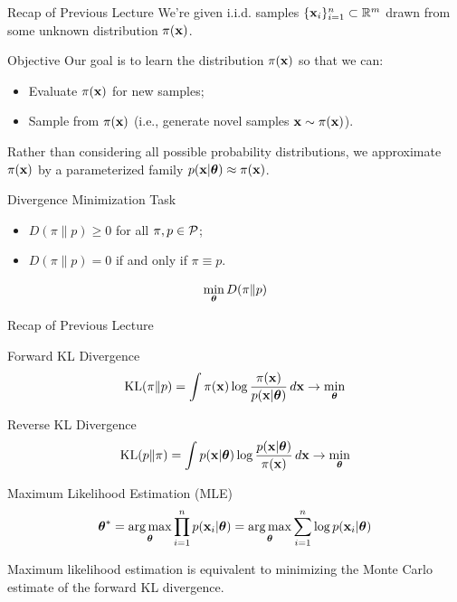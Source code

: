 \documentclass{beamer}
\begin{document}
\begin{frame}
\titlepage
\end{frame}
\begin{frame}{Recap of Previous Lecture}
	We're given i.i.d. samples $\{\mathbf{x}_i\}_{i=1}^n \subset \mathbb{R}^m$ drawn from some unknown distribution $\pi(\mathbf{x})$.

	\begin{block}{Objective}
		Our goal is to learn the distribution $\pi(\mathbf{x})$ so that we can:
		\begin{itemize}
		    \item Evaluate $\pi(\mathbf{x})$ for new samples;
		    \item Sample from $\pi(\mathbf{x})$ (i.e., generate novel samples $\mathbf{x} \sim \pi(\mathbf{x})$).
		\end{itemize}
	\end{block}
	Rather than considering all possible probability distributions, we approximate $\pi(\mathbf{x})$ by a parameterized family $p(\mathbf{x} | \boldsymbol{\theta}) \approx \pi(\mathbf{x})$.

	\begin{block}{Divergence Minimization Task}
		\begin{itemize}
			\item $D(\pi \| p) \geq 0$ for all $\pi, p \in \mathcal{P}$;
			\item $D(\pi \| p) = 0$ if and only if $\pi \equiv p$.
		\end{itemize}
		\[
		\min_{\boldsymbol{\theta}} D(\pi \| p)
		\]
	\end{block}
\end{frame}
\begin{frame}{Recap of Previous Lecture}
	\begin{block}{Forward KL Divergence}
		\vspace{-0.2cm}
		\[
		\mathrm{KL}(\pi \| p) = \int \pi (\mathbf{x}) \log \frac{\pi(\mathbf{x})}{p(\mathbf{x} | \boldsymbol{\theta})}\, d \mathbf{x} \rightarrow \min_{\boldsymbol{\theta}}
		\]
	\end{block}
	\begin{block}{Reverse KL Divergence}
		\vspace{-0.2cm}
		\[
		\mathrm{KL}(p \| \pi) = \int p (\mathbf{x}| \boldsymbol{\theta}) \log \frac{p(\mathbf{x}| \boldsymbol{\theta})}{\pi(\mathbf{x})}\, d \mathbf{x} \rightarrow \min_{\boldsymbol{\theta}}
		\]
	\end{block}
	
	\begin{block}{Maximum Likelihood Estimation (MLE)}
		\vspace{-0.3cm}
		\[
		\boldsymbol{\theta}^* = \operatorname*{arg\,max}_{\boldsymbol{\theta}} \prod_{i=1}^n p(\mathbf{x}_i | \boldsymbol{\theta}) = \operatorname*{arg\,max}_{\boldsymbol{\theta}} \sum_{i=1}^n \log p(\mathbf{x}_i | \boldsymbol{\theta})
		\]
		\vspace{-0.1cm}
	\end{block}
	Maximum likelihood estimation is equivalent to minimizing the Monte Carlo estimate of the forward KL divergence.
\end{frame}
\end{document}
